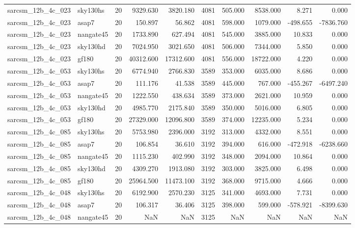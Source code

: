 \begin{longtable}{llrrrrrrrr}
sarcsm\_12b\_4c\_023 & sky130hs & 20 & 9329.630 & 3820.180 & 4081 & 505.000 & 8538.000 & 8.271 & 0.000 \\
sarcsm\_12b\_4c\_023 & asap7 & 20 & 150.897 & 56.862 & 4081 & 598.000 & 1079.000 & -498.655 & -7836.760 \\
sarcsm\_12b\_4c\_023 & nangate45 & 20 & 1733.890 & 627.494 & 4081 & 545.000 & 3885.000 & 10.833 & 0.000 \\
sarcsm\_12b\_4c\_023 & sky130hd & 20 & 7024.950 & 3021.650 & 4081 & 506.000 & 7344.000 & 5.850 & 0.000 \\
sarcsm\_12b\_4c\_023 & gf180 & 20 & 40312.600 & 17312.600 & 4081 & 556.000 & 18722.000 & 4.220 & 0.000 \\
sarcsm\_12b\_4c\_053 & sky130hs & 20 & 6774.940 & 2766.830 & 3589 & 353.000 & 6035.000 & 8.686 & 0.000 \\
sarcsm\_12b\_4c\_053 & asap7 & 20 & 111.176 & 41.538 & 3589 & 445.000 & 767.000 & -455.267 & -6497.240 \\
sarcsm\_12b\_4c\_053 & nangate45 & 20 & 1222.550 & 438.634 & 3589 & 373.000 & 2621.000 & 10.959 & 0.000 \\
sarcsm\_12b\_4c\_053 & sky130hd & 20 & 4985.770 & 2175.840 & 3589 & 350.000 & 5016.000 & 6.805 & 0.000 \\
sarcsm\_12b\_4c\_053 & gf180 & 20 & 27329.000 & 12096.800 & 3589 & 374.000 & 12235.000 & 5.234 & 0.000 \\
sarcsm\_12b\_4c\_085 & sky130hs & 20 & 5753.980 & 2396.000 & 3192 & 313.000 & 4332.000 & 8.551 & 0.000 \\
sarcsm\_12b\_4c\_085 & asap7 & 20 & 106.854 & 36.610 & 3192 & 394.000 & 616.000 & -472.918 & -6238.660 \\
sarcsm\_12b\_4c\_085 & nangate45 & 20 & 1115.230 & 402.990 & 3192 & 348.000 & 2094.000 & 10.864 & 0.000 \\
sarcsm\_12b\_4c\_085 & sky130hd & 20 & 4309.270 & 1913.080 & 3192 & 303.000 & 3825.000 & 6.498 & 0.000 \\
sarcsm\_12b\_4c\_085 & gf180 & 20 & 25964.500 & 11473.100 & 3192 & 368.000 & 9715.000 & 4.666 & 0.000 \\
sarcsm\_12b\_4c\_048 & sky130hs & 20 & 6192.900 & 2570.230 & 3125 & 341.000 & 4693.000 & 7.731 & 0.000 \\
sarcsm\_12b\_4c\_048 & asap7 & 20 & 106.317 & 36.406 & 3125 & 398.000 & 599.000 & -578.921 & -8399.630 \\
sarcsm\_12b\_4c\_048 & nangate45 & 20 & NaN & NaN & 3125 & NaN & NaN & NaN & NaN \\

\end{longtable}
